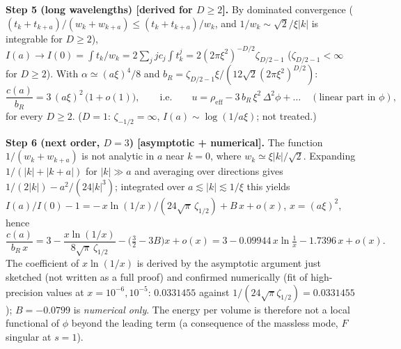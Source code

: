 \smallskip\noindent\textbf{Step 5 (long wavelengths) [derived for $D\ge2$].} By dominated convergence
($(t_k+t_{k+a})/(w_k+w_{k+a})\le(t_k+t_{k+a})/w_k$, and $1/w_k\sim\sqrt2/\xi|k|$ is integrable for $D\ge2$),
$I(a)\to I(0)=\int t_k/w_k=2\sum_j jc_j\int t_k^j=2(2\pi\xi^2)^{-D/2}\zeta_{D/2-1}$ ($\zeta_{D/2-1}<\infty$ for
$D\ge2$). With $\alpha\simeq(a\xi)^4/8$ and $b_R=\zeta_{D/2-1}\xi/(12\sqrt2(2\pi\xi^2)^{D/2})$:
\begin{equation}\label{eq:A151-limit}
\frac{c(a)}{b_R}=3\,(a\xi)^2\,\big(1+o(1)\big),\qquad\text{i.e.}\qquad
u=\rho_{\mathrm{eff}}-3\,b_R\,\xi^2\,\Delta^2\phi+\dots\quad(\text{linear part in }\phi),
\end{equation}
for every $D\ge2$. ($D=1$: $\zeta_{-1/2}=\infty$, $I(a)\sim\log(1/a\xi)$; not treated.)

\smallskip\noindent\textbf{Step 6 (next order, $D=3$) [asymptotic + numerical].} The function $1/(w_k+w_{k+a})$ is not
analytic in $a$ near $k=0$, where $w_k\simeq\xi|k|/\sqrt2$. Expanding $1/(|k|+|k+a|)$ for $|k|\gg a$ and averaging
over directions gives $1/(2|k|)-a^2/(24|k|^3)$; integrated over $a\lesssim|k|\lesssim1/\xi$ this yields
$I(a)/I(0)-1=-\,x\ln(1/x)/(24\sqrt\pi\,\zeta_{1/2})+B\,x+o(x)$, $x=(a\xi)^2$, hence
\begin{equation}\label{eq:A151-next}
\frac{c(a)}{b_R\,x}=3-\frac{x\ln(1/x)}{8\sqrt\pi\,\zeta_{1/2}}-\Big(\tfrac32-3B\Big)x+o(x)
=3-0.09944\,x\ln\tfrac1x-1.7396\,x+o(x).
\end{equation}
The coefficient of $x\ln(1/x)$ is derived by the asymptotic argument just sketched (not written as a full proof) and
confirmed numerically (fit of high-precision values at $x=10^{-6},10^{-5}$: $0.0331455$ against
$1/(24\sqrt\pi\zeta_{1/2})=0.0331455$); $B=-0.0799$ is \emph{numerical only}. The energy per volume is therefore not
a local functional of $\phi$ beyond the leading term (a consequence of the massless mode, $F$ singular at $s=1$).

